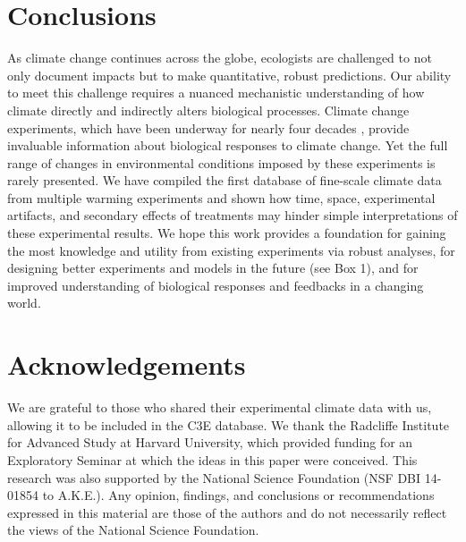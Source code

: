 \documentclass{article}
\begin{document}
\section* {Conclusions}
\par As climate change continues across the globe, ecologists are challenged to not only document impacts but to make quantitative, robust predictions. Our ability to meet this challenge requires a nuanced mechanistic understanding of how climate directly and indirectly alters biological processes. Climate change experiments, which have been underway for nearly four decades \citep[e.g.,][]{tamaki1981,carlson1982,melillo2017}, provide invaluable information about biological responses to climate change. Yet the full range of changes in environmental conditions imposed by these experiments is rarely presented. We have compiled the first database of fine-scale climate data from multiple warming experiments and shown how time, space, experimental artifacts, and secondary effects of treatments may hinder simple interpretations of these experimental results. We hope this work provides a foundation for gaining the most knowledge and utility from existing experiments via robust analyses, for designing better experiments and models in the future (see Box 1), and for improved understanding of biological responses and feedbacks in a changing world.
 \section* {Acknowledgements}
We are grateful to those who shared their experimental climate data with us, allowing it to be included in the C3E database. We thank the Radcliffe Institute for Advanced Study at Harvard University, which provided funding for an Exploratory Seminar at which the ideas in this paper were conceived. This research was also supported by the National Science Foundation (NSF DBI 14-01854 to A.K.E.). Any opinion, findings, and conclusions or recommendations expressed in this material are those of the authors and do not necessarily reflect the views of the National Science Foundation.
\end{document}

